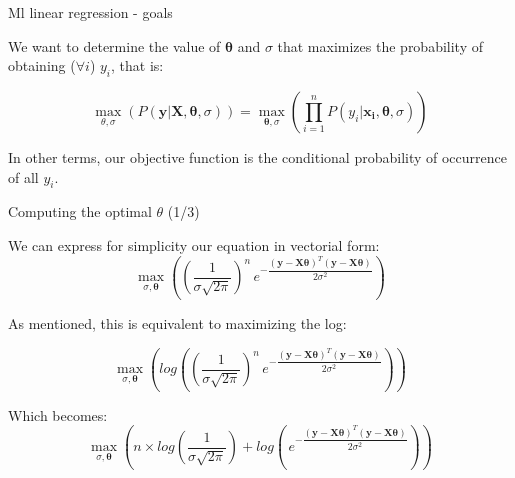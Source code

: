 \documentclass{beamer}
\begin{document}
\begin{frame}
{\centerline{Ml linear regression - goals}}

We want to determine the value of $\boldsymbol{\theta}$ and $\sigma$ that maximizes the probability of obtaining ($\forall i$) $y_i$, that is:

$$ \max_{\theta, \sigma}( P(\mathbf{y} | \boldsymbol{X}, \boldsymbol{\theta}, \sigma)) = \max_{\boldsymbol{\theta}, \sigma}(\prod_{i=1}^n P(y_i | \boldsymbol{x_i}, \boldsymbol{\theta}, \sigma)) $$


\vspace*{0.5cm}
In other terms, our objective function is the conditional probability of occurrence of all $y_i$.


\end{frame}

\begin{frame}
{\centerline{Computing the optimal $\theta$ (1/3)}}
We can express for simplicity our equation in vectorial form:
$$\max_{\sigma, \boldsymbol{\theta}}\left ( \left (\dfrac 1 {\sigma \sqrt{2 \pi} } \right)^n \, e^{-\dfrac { (\boldsymbol{y} - \boldsymbol{X\theta})^T (\boldsymbol{y} - \boldsymbol{X\theta})} {2 \sigma^2} }\right)$$

As mentioned, this is equivalent to maximizing the log:

$$\max_{\sigma, \boldsymbol{\theta}} \left( log \left (\left (\dfrac 1 {\sigma \sqrt{2 \pi} } \right )^n \, e^{-\dfrac { (\boldsymbol{y} - \boldsymbol{X\theta})^T (\boldsymbol{y} - \boldsymbol{X\theta})} {2 \sigma^2} }\right) \right )$$

Which becomes:
$$\max_{\sigma, \boldsymbol{\theta}} \left( n \times log \left (\dfrac 1 {\sigma \sqrt{2 \pi} } \right ) + log \left( \, e^{-\dfrac { (\boldsymbol{y} - \boldsymbol{X\theta})^T (\boldsymbol{y} - \boldsymbol{X\theta})} {2 \sigma^2} }\right) \right )$$

\end{frame}
\end{document}
